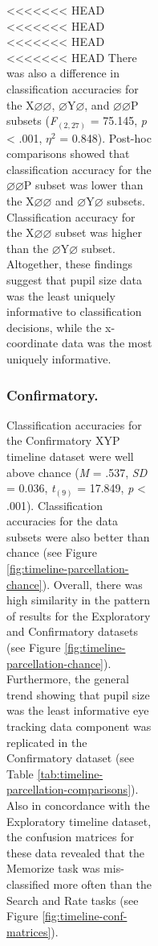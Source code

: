 \documentclass[
  english,
  man, donotrepeattitle,floatsintext]{apa6}
\begin{document}
\begin{figure}
\begin{figure}
\begin{figure}
\begin{figure}
<<<<<<< HEAD
<<<<<<< HEAD
<<<<<<< HEAD
<<<<<<< HEAD
There was also a difference in classification accuracies for the X\(\varnothing\varnothing\), \(\varnothing\)Y\(\varnothing\), and \(\varnothing\varnothing\)P subsets (\emph{F}\(_{(2, 27)}\) = 75.145, \emph{p} \textless{} .001, \textit{$\eta$}\(^{2}\) = 0.848). Post-hoc comparisons showed that classification accuracy for the \(\varnothing\varnothing\)P subset was lower than the X\(\varnothing\varnothing\) and \(\varnothing\)Y\(\varnothing\) subsets. Classification accuracy for the X\(\varnothing\varnothing\) subset was higher than the \(\varnothing\)Y\(\varnothing\) subset. Altogether, these findings suggest that pupil size data was the least uniquely informative to classification decisions, while the x-coordinate data was the most uniquely informative.

\subsubsection{Confirmatory.}

Classification accuracies for the Confirmatory XYP timeline dataset were well above chance (\emph{M} = .537, \emph{SD} = 0.036, \emph{t}\(_{(9)}\) = 17.849, \emph{p} \textless{} .001). Classification accuracies for the data subsets were also better than chance (see Figure \ref{fig:timeline-parcellation-chance}). Overall, there was high similarity in the pattern of results for the Exploratory and Confirmatory datasets (see Figure \ref{fig:timeline-parcellation-chance}). Furthermore, the general trend showing that pupil size was the least informative eye tracking data component was replicated in the Confirmatory dataset (see Table \ref{tab:timeline-parcellation-comparisons}). Also in concordance with the Exploratory timeline dataset, the confusion matrices for these data revealed that the Memorize task was mis-classified more often than the Search and Rate tasks (see Figure \ref{fig:timeline-conf-matrices}).


\end{figure}
\end{figure}
\end{figure}
\end{figure}
\end{document}
